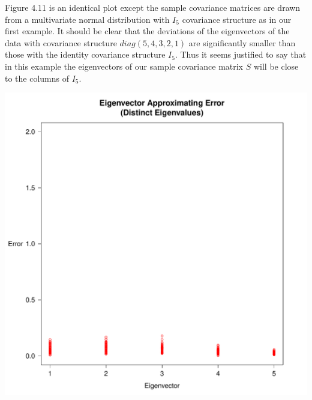 \documentclass{book}
\begin{document}
Figure 4.11 is an identical plot except the sample covariance matrices are drawn from a multivariate normal distribution with $I_5$ covariance structure as in our first example. It should be clear that the deviations of the eigenvectors of the data with covariance structure $diag(5,4,3,2,1)$ are significantly smaller than those with the identity covariance structure $I_5$. Thus it seems justified to say that in this example the eigenvectors of our sample covariance matrix $S$ will be close to the columns of $I_5$. 

\newpage
\begin{center}
\includegraphics[scale=.43]{./Figures/diag_ex_2/e_vec_approx_diff.pdf}%
\end{center}
\end{document}
